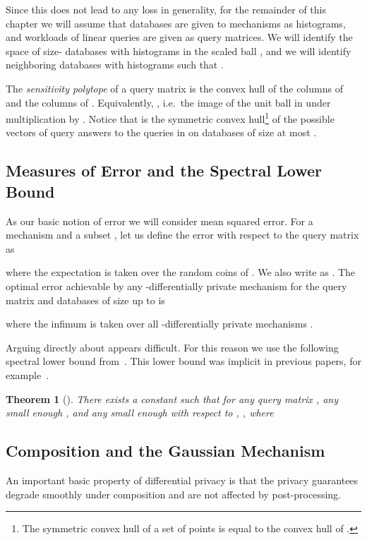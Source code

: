 \documentclass{article}
\newtheorem{theorem}{Theorem}[section]
\begin{document}
Since this does not lead to any loss in generality, for the remainder
of this chapter we will assume that databases are given to mechanisms
as histograms, and workloads of linear queries are given as query
matrices. We will identify the space of size- databases with
histograms in the scaled  ball , and we will identify neighboring
databases with histograms  such that . 


The \emph{sensitivity polytope}  of a query matrix  is the convex hull of the columns of  and
the columns of . Equivalently, ,
i.e.~the image of the unit  ball in  under
multiplication by . Notice that  is
the symmetric convex hull\footnote{The symmetric convex hull of a set
  of points  is equal to the convex hull of .} of the possible vectors of query answers to the
queries in  on databases of size at most .


\subsection{Measures of Error and the Spectral Lower Bound}

As our basic notion of error we will consider mean squared error.
For a mechanism  and a subset , let us
define the error with respect to the query matrix  as

where the expectation is taken over the random coins of
.
We also write  as . The optimal
error achievable by any -differentially private
mechanism for the query matrix  and databases of size up to  is

where the infimum is taken over all -differentially
private mechanisms .

Arguing directly about  appears
difficult. For this reason we use the following spectral lower bound
from~\cite{NTZ}. This lower bound was implicit in previous papers, for example~\cite{shiva2010}.

\begin{theorem}[\cite{NTZ}]\label{thm:speclb-small}
  There exists a constant  such that for any query matrix , any small enough , and any 
  small enough with respect to , , where
  

\end{theorem}

\subsection{Composition and the Gaussian Mechanism}

An important basic property of differential privacy is that the
privacy guarantees degrade smoothly under composition and are not
affected by post-processing.
\end{document}
